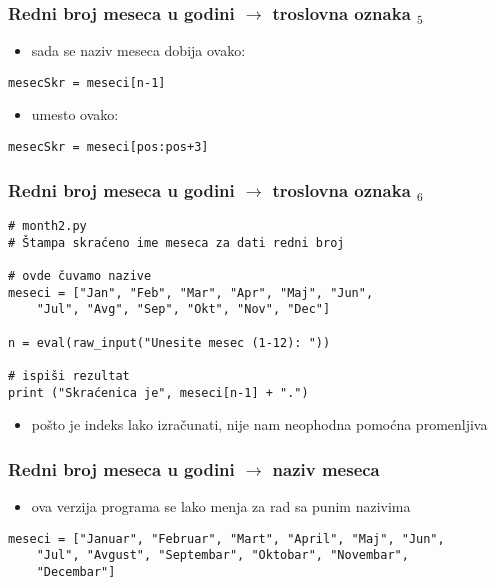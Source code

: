 \documentclass[utf8,compress]{beamer}
\begin{document}
\begin{frame}[fragile]
  \frametitle{Redni broj meseca u godini $\rightarrow$ troslovna oznaka $_5$}
  \begin{itemize}
    \item sada se naziv meseca dobija ovako:
  \end{itemize}
\begin{verbatim}
mesecSkr = meseci[n-1]
\end{verbatim}
  \begin{itemize}
    \item umesto ovako:
  \end{itemize}
\begin{verbatim}
mesecSkr = meseci[pos:pos+3]
\end{verbatim}
\end{frame}

\begin{frame}[fragile,shrink=10]
  \frametitle{Redni broj meseca u godini $\rightarrow$ troslovna oznaka $_6$}
\begin{verbatim}
# month2.py
# Štampa skraćeno ime meseca za dati redni broj

# ovde čuvamo nazive
meseci = ["Jan", "Feb", "Mar", "Apr", "Maj", "Jun", 
    "Jul", "Avg", "Sep", "Okt", "Nov", "Dec"]

n = eval(raw_input("Unesite mesec (1-12): "))

# ispiši rezultat
print ("Skraćenica je", meseci[n-1] + ".")
\end{verbatim}
  \begin{itemize}
    \item pošto je indeks lako izračunati, nije nam neophodna pomoćna promenljiva
  \end{itemize}
\end{frame}

\begin{frame}[fragile,shrink=10]
  \frametitle{Redni broj meseca u godini $\rightarrow$ naziv meseca}
  \begin{itemize}
    \item ova verzija programa se lako menja za rad sa punim nazivima
  \end{itemize}
\begin{verbatim}
meseci = ["Januar", "Februar", "Mart", "April", "Maj", "Jun", 
    "Jul", "Avgust", "Septembar", "Oktobar", "Novembar", 
    "Decembar"]
\end{verbatim}
\end{frame}
\end{document}
